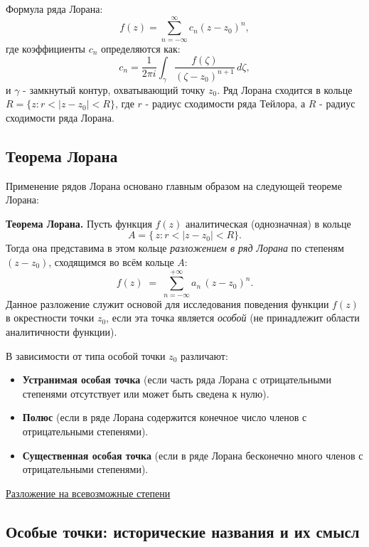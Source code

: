 \documentclass[a4paper,12pt]{article}
\begin{document}
Формула ряда Лорана:
\begin{equation*}
    f(z) = \sum_{n=-\infty}^{\infty} c_n (z - z_0)^n,
\end{equation*}
где коэффициенты $c_n$ определяются как:
\begin{equation*}
    c_n = \frac{1}{2\pi i} \int_{\gamma} \frac{f(\zeta)}{(\zeta - z_0)^{n+1}} \, d\zeta,
\end{equation*}
и $\gamma$ - замкнутый контур, охватывающий точку $z_0$. Ряд Лорана сходится в кольце
$R = \{z: r < |z - z_0| < R\}$, где $r$ - радиус сходимости ряда Тейлора, а $R$ - радиус
сходимости ряда Лорана.


\subsection{Теорема Лорана}

Применение рядов Лорана основано главным образом на следующей теореме Лорана:

\textbf{Теорема Лорана.}
Пусть функция $f(z)$ аналитическая (однозначная) в кольце
\[
A = \{\,z : r < |z - z_0| < R \}.
\]
Тогда она представима в этом кольце \textit{разложением в ряд Лорана} по степеням $(z - z_0)$, сходящимся во всём кольце $A$:
\[
f(z) \;=\; \sum_{n=-\infty}^{+\infty} a_n \,(z - z_0)^n.
\]
Данное разложение служит основой для исследования поведения функции $f(z)$ в окрестности точки $z_0$, если эта точка является \textit{особой} (не принадлежит области аналитичности функции).

\vspace{2ex}
В зависимости от типа особой точки $z_0$ различают:
\begin{itemize}
    \item \textbf{Устранимая особая точка} (если часть ряда Лорана с отрицательными степенями отсутствует или может быть сведена к нулю).
    \item \textbf{Полюс} (если в ряде Лорана содержится конечное число членов с отрицательными степенями).
    \item \textbf{Существенная особая точка} (если в ряде Лорана бесконечно много членов с отрицательными степенями).
\end{itemize}
\href{https://www.youtube.com/watch?v=BGf3L-MLWc8&list=PL_RWQIyLkfYulHxhBfXHhFxmqouU3U2Jd&index=32}{Разложение на всевозможные степени}

\subsection{Особые точки: исторические названия и их смысл}
\end{document}
